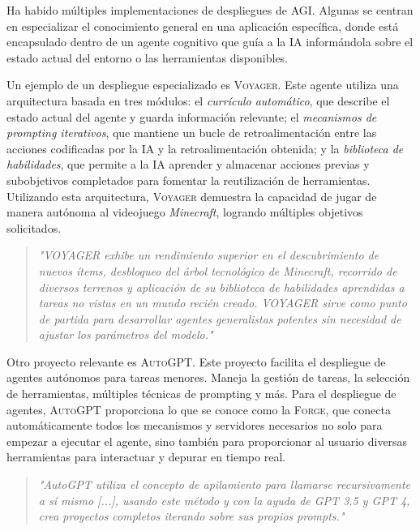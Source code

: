 Ha habido múltiples implementaciones de despliegues de AGI. Algunas se centran
en especializar el conocimiento general en una aplicación específica, donde está
encapsulado dentro de un agente cognitivo que guía a la IA informándola sobre el
estado actual del entorno o las herramientas disponibles.

Un ejemplo de un despliegue especializado es \textsc{Voyager}. Este agente
utiliza una arquitectura basada en tres módulos: el \emph{currículo automático},
que describe el estado actual del agente y guarda información relevante; el
\emph{mecanismos de prompting iterativos}, que mantiene un bucle de
retroalimentación entre las acciones codificadas por la IA y la
retroalimentación obtenida; y la \emph{biblioteca de habilidades}, que permite a
la IA aprender y almacenar acciones previas y subobjetivos completados para
fomentar la reutilización de herramientas. Utilizando esta arquitectura,
\textsc{Voyager} demuestra la capacidad de jugar de manera autónoma al
videojuego \emph{Minecraft}, logrando múltiples objetivos solicitados.

\begin{quote} \small\textit{ 
    "VOYAGER exhibe un rendimiento superior en el descubrimiento de nuevos
    ítems, desbloqueo del árbol tecnológico de Minecraft, recorrido de diversos
    terrenos y aplicación de su biblioteca de habilidades aprendidas a tareas no
    vistas en un mundo recién creado. VOYAGER sirve como punto de partida para
    desarrollar agentes generalistas potentes sin necesidad de ajustar los
    parámetros del modelo." 
\citet{wang2023voyager} } \end{quote}

Otro proyecto relevante es \textsc{AutoGPT}. Este proyecto facilita el despliegue de
agentes autónomos para tareas menores. Maneja la gestión de tareas, la selección
de herramientas, múltiples técnicas de prompting y más. Para el despliegue de
agentes, \textsc{AutoGPT} proporciona lo que se conoce como la \textsc{Forge}, que
conecta automáticamente todos los mecanismos y servidores necesarios no solo
para empezar a ejecutar el agente, sino también para proporcionar al usuario
diversas herramientas para interactuar y depurar en tiempo real.

\begin{quote} \small\textit{
    "AutoGPT utiliza el concepto de apilamiento para llamarse recursivamente a
    sí mismo [...], usando este método y con la ayuda de GPT 3.5 y GPT 4, crea
    proyectos completos iterando sobre sus propios prompts." 
\citet{fezari2023gpt} } \end{quote}

